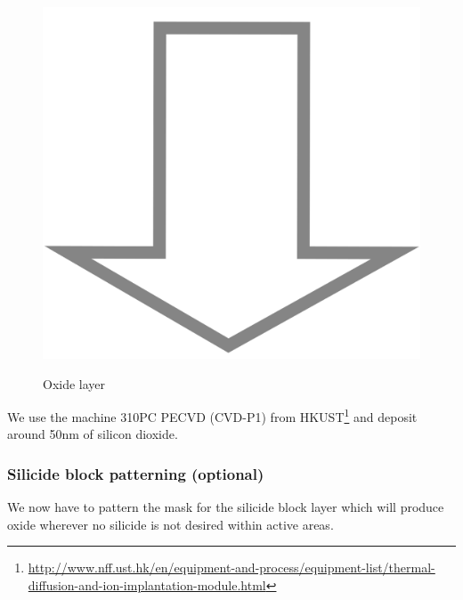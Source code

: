 \begin{figure}[H]
	\centering
	\begin{tikzpicture}[node distance = 3cm, auto, thick,scale=\CrossSectionOnly, every node/.style={transform shape}]
		
	\end{tikzpicture}\\
	\includegraphics[scale=0.01]{down_arrow.png}\\
	\begin{tikzpicture}[node distance = 3cm, auto, thick,scale=\CrossSectionOnly, every node/.style={transform shape}]
		
	\end{tikzpicture}
	\caption{Oxide layer}
\end{figure}

We use the machine 310PC PECVD (CVD-P1) from HKUST\footnote{\url{http://www.nff.ust.hk/en/equipment-and-process/equipment-list/thermal-diffusion-and-ion-implantation-module.html}} and deposit around 50nm of silicon dioxide.

\subsubsection{Silicide block patterning (optional)}

We now have to pattern the mask for the silicide block layer which will produce oxide wherever no silicide is not desired within active areas.


